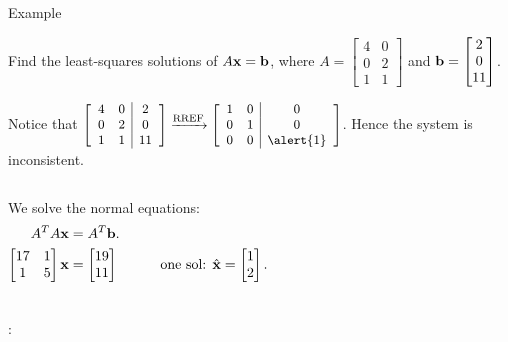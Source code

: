 \documentclass[xcolor=dvipsnames,aspectratio=169,t]{beamer}
\begin{document}
\begin{frame}{Example}
\smallskip

  Find the least-squares solutions of $A\mathbf{x}=\mathbf{b}$, where
  $A = \begin{bmatrix} 4 & 0 \\ 0 & 2 \\ 1 & 1 \end{bmatrix}$
  and 
  $\mathbf{b} = \begin{bmatrix} 2 \\ 0 \\ 11 \end{bmatrix}$.
  \medskip
  
  \pause
  Notice that 
  $\small \left[\begin{array}{cc|c} 4 & 0 & 2\\0 & 2 & 0\\1 & 1 & 11\end{array}\right]
  \xrightarrow{\text{RREF}}
  \left[\begin{array}{cc|c} 1 & 0 & 0\\0 & 1 & 0\\0 & 0 & \alert{1} \end{array}\right]$.
  Hence the system is \alert{inconsistent}.
  \vspace*{2em}
  
  \pause
  \begin{columns}[T]
  We solve the \alert{normal equations}:
  \vspace*{-1.5em}
  \begin{align*}
    A^T A\mathbf{x} & =A^T\mathbf{b}. \\
    \begin{bmatrix} 17 & 1 \\ 1 & 5 \end{bmatrix} \mathbf{x} &=
    \begin{bmatrix} 19 \\ 11 \end{bmatrix}
    \hspace*{3em} \text{one sol: } \hat{\mathbf{x}}=\begin{bmatrix} 1 \\ 2 \end{bmatrix}.
  \end{align*}
  \end{columns}
  \bigskip
  
  \pause
  :
  \smallskip
  

\end{frame}
\end{document}
